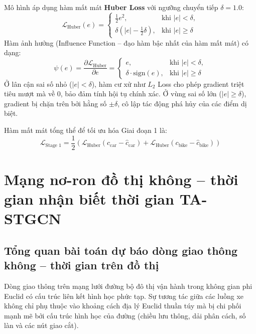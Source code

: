 Mô hình áp dụng hàm mất mát \textbf{Huber Loss} với ngưỡng chuyển tiếp $\delta = 1.0$:
\begin{equation}
    \mathcal{L}_{\mathrm{Huber}}(e) =
    \begin{cases}
    \frac{1}{2} e^2, & \text{khi } |e| < \delta, \\[4pt]
    \delta \left( |e| - \frac{1}{2} \delta \right), & \text{khi } |e| \ge \delta
    \end{cases}
\end{equation}
Hàm ảnh hưởng (Influence Function -- đạo hàm bậc nhất của hàm mất mát) có dạng:
\begin{equation}
    \psi(e) = \frac{\partial \mathcal{L}_{\mathrm{Huber}}}{\partial e} =
    \begin{cases}
    e, & \text{khi } |e| < \delta, \\[4pt]
    \delta \cdot \text{sign}(e), & \text{khi } |e| \ge \delta
    \end{cases}
\end{equation}
Ở lân cận sai số nhỏ ($|e| < \delta$), hàm cư xử như $L_2$ Loss cho phép gradient triệt tiêu mượt mà về 0, bảo đảm tính hội tụ chính xác. Ở vùng sai số lớn ($|e| \ge \delta$), gradient bị chặn trên bởi hằng số $\pm \delta$, cô lập tác động phá hủy của các điểm dị biệt.

Hàm mất mát tổng thể để tối ưu hóa Giai đoạn 1 là:
\begin{equation}
    \mathcal{L}_{\text{Stage 1}} = \frac{1}{2} \left( \mathcal{L}_{\mathrm{Huber}}(c_{\text{car}} - \hat{c}_{\text{car}}) + \mathcal{L}_{\mathrm{Huber}}(c_{\text{bike}} - \hat{c}_{\text{bike}}) \right)
\end{equation}

\section{Mạng nơ-ron đồ thị không -- thời gian nhận biết thời gian TA-STGCN}
\label{sec:kien_truc_ta_stgcn}

\subsection{Tổng quan bài toán dự báo dòng giao thông không -- thời gian trên đồ thị}
\label{sec:bieu_dien_khong_gian_thoi_gian}

Dòng giao thông trên mạng lưới đường bộ đô thị vận hành trong không gian phi Euclid có cấu trúc liên kết hình học phức tạp. Sự tương tác giữa các luồng xe không chỉ phụ thuộc vào khoảng cách địa lý Euclid thuần túy mà bị chi phối mạnh mẽ bởi cấu trúc hình học của đường (chiều lưu thông, dải phân cách, số làn và các nút giao cắt). 

